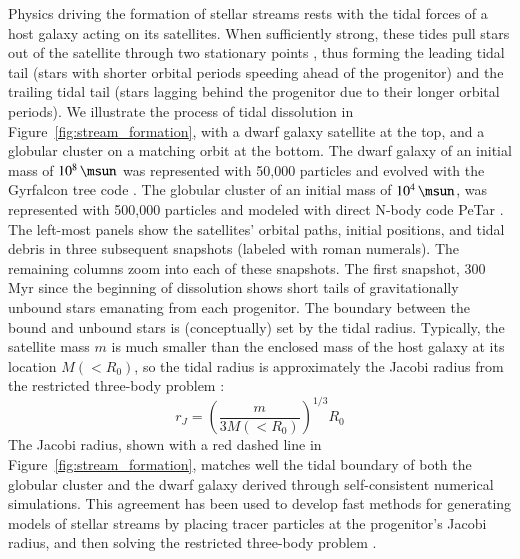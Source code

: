 \documentclass[final,5p,times,twocolumn,authoryear]{elsarticle}
\begin{document}
Physics driving the formation of stellar streams rests with the tidal forces of a host galaxy acting on its satellites.
When sufficiently strong, these tides pull stars out of the satellite through two stationary points \citep{bt:2008}, thus forming the leading tidal tail (stars with shorter orbital periods speeding ahead of the progenitor) and the trailing tidal tail (stars lagging behind the progenitor due to their longer orbital periods).
We illustrate the process of tidal dissolution in Figure~\ref{fig:stream_formation}, with a dwarf galaxy satellite at the top, and a globular cluster on a matching orbit at the bottom.
The dwarf galaxy of an initial mass of $10^8\,\unit{\msun}$ was represented with 50,000 particles and evolved with the Gyrfalcon tree code \citep{dehnen:2014}.
The globular cluster of an initial mass of $10^4\,\unit{\msun}$, was represented with 500,000 particles and modeled with direct N-body code PeTar \citep{wang:2020}.
The left-most panels show the satellites' orbital paths, initial positions, and tidal debris in three subsequent snapshots (labeled with roman numerals).
The remaining columns zoom into each of these snapshots.
The first snapshot, 300\,\unit{Myr} since the beginning of dissolution shows short tails of gravitationally unbound stars emanating from each progenitor.
The boundary between the bound and unbound stars is (conceptually) set by the tidal radius.
Typically, the satellite mass $m$ is much smaller than the enclosed mass of the host galaxy at its location $M(<R_0)$, so the tidal radius is approximately the Jacobi radius from the restricted three-body problem \citep[][]{szebehely:1967, valtonen:2006}:
\begin{equation}
r_J = \left(\frac{m}{3M(<R_0)}\right)^{1/3} R_0
\end{equation}
The Jacobi radius, shown with a red dashed line in Figure~\ref{fig:stream_formation}, matches well the tidal boundary of both the globular cluster and the dwarf galaxy derived through self-consistent numerical simulations.
This agreement has been used to develop fast methods for generating models of stellar streams by placing tracer particles at the progenitor's Jacobi radius, and then solving the restricted three-body problem \citep[the so-called \emph{particle-spray methods};][]{varghese:2011, lane:2012, kupper:2012, bonaca:2014, gibbons:2014, fardal:2015}.
\end{document}
